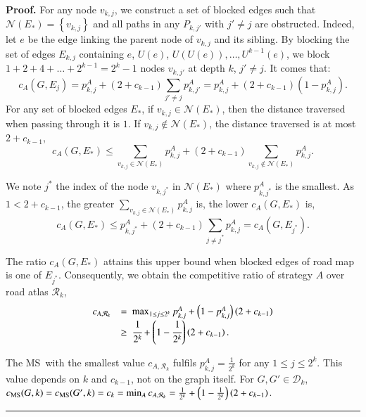 \documentclass[preprint]{elsarticle}
\newenvironment{proof}[1][Proof]{\textbf{#1.} }{\ \rule{0.5em}{0.5em}}
\newcommand{\set}[1]{\left\{ #1 \right\}}
\newcommand{\mcalr}{\mathcal{R}}
\newcommand{\mcald}{\mathcal{D}}
\newcommand{\mcaln}{\mathcal{N}}
\newcommand{\mts}{MS}
\newcommand{\cms}{c_{\mbox{\scriptsize{MS}}}}
\begin{document}
\begin{proof}
For any node $v_{k,j}$, we construct a set of blocked edges such that $\mcaln(E_*) = \set{v_{k,j}}$ and all paths in any $P_{k,j'}$ with $j' \neq j$ are obstructed. Indeed, let $e$ be the edge linking the parent node of $v_{k,j}$ and its sibling. By blocking the set of edges $E_{k,j}$ containing $e$,  $U(e)$, $U(U(e)),\ldots, U^{k-1}(e)$, we block $1+2+4+\ldots+2^{k-1} = 2^k - 1$ nodes $v_{k,j'}$ at depth $k$, $j' \neq j$. 
It comes that:
\[
c_A(G, E_j) = p_{k,j}^A + (2+c_{k-1})\sum_{j' \neq j}p_{k,j'}^A = p_{k,j}^A + (2+c_{k-1})(1-p_{k,j}^A).
\]
For any set of blocked edges $E_*$, if $v_{k,j} \in \mcaln(E_*)$, then the distance traversed when passing through it is $1$. If $v_{k,j} \notin \mcaln(E_*)$, the distance traversed is at most $2 + c_{k-1}$,
\[
c_A(G, E_*) \leq \sum_{v_{k,j}\in \mcaln(E_*)} p_{k,j}^A+  (2+c_{k-1})\sum_{v_{k,j}\notin \mcaln(E_*)}p_{k,j}^A.
\]

We note $j^*$ the index of the node $v_{k,j^*}$ in $\mcaln\left(E_*\right)$ where $p_{k,j^*}^A$ is the smallest. As $1 < 2 + c_{k-1}$, the greater $\sum_{v_{k,j}\in \mcaln(E_*)} p_{k,j}^A$ is, the lower $c_A(G, E_*)$ is,
\[
c_A(G, E_*) \le p_{k,j^*}^A + (2+c_{k-1})\sum_{j\neq j^*}p_{k,j}^A = c_A(G, E_{j^*}).
\] 

The ratio $c_A(G, E_*)$ attains this upper bound when blocked edges of road map is one of $E_{j^*}$. Consequently, we obtain the competitive ratio of strategy $A$ over road atlas $\mcalr_k$,
\[
\begin{array}{rl}
c_{A,\mcalr_k} & =  ~\max_{1 \le j \le 2^k} p_{k,j}^{A} + \left(1-p_{k,j}^{A}\right)\left(2+c_{k-1}\right)\\
& \geq ~\cfrac{1}{2^k} + \left(1-\cfrac{1}{2^k}\right)\left(2+c_{k-1}\right).
\end{array}
\]

The \mts ~with the smallest value $c_{A,\mcalr_k}$ fulfils $p_{k,j}^A = \frac{1}{2^k}$ for any $1 \le j \le 2^k$. This value depends on $k$ and $c_{k-1}$, not on the graph itself. For $G,G' \in \mcald_k$, $\cms(G,k) = \cms(G',k) = c_k = \min_{A} c_{A,\mcalr_k} = \frac{1}{2^k} + \left(1-\frac{1}{2^k}\right)\left(2+c_{k-1}\right)$.
\end{proof}
\end{document}
